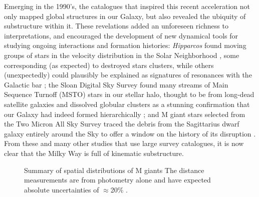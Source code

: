 \documentclass[galaxies,article,submit,moreauthors,pdftex,10pt,a4paper]{mdpi}
\newcommand{\survey}[1]{\textsl{#1}}
\begin{document}
Emerging in the 1990's, the catalogues that inspired this recent acceleration not only mapped global structures in our Galaxy, but also revealed the ubiquity of substructure within it.
These revelations added an unforeseen richness to interpretations, and encouraged the development of new dynamical tools for studying ongoing interactions and formation histories:
\survey{Hipparcos} \citep{esa97} found moving groups of stars in the velocity distribution in the Solar Neighborhood \citep{dehnen98}, some corresponding (as expected) to destroyed stars clusters, while others (unexpectedly) could plausibly be explained as signatures of resonances with the Galactic bar \citep{dehnen00};
the Sloan Digital Sky Survey \citep[hereafter, SDSS ---][]{york00,stoughton02,abazajian03} found many streams of Main Sequence Turnoff (MSTO) stars in our stellar halo, thought to be from long-dead satellite galaxies and dissolved globular clusters \citep{newberg02,belokurov06} as a stunning confirmation that our Galaxy had indeed formed hierarchically \citep[e.g.][]{bullock01,bullock05};
and M giant stars selected from the Two Micron All Sky Survey \citep[hereafter, 2MASS ---][]{nikolaev00} traced the debris from the Sagittarius dwarf galaxy entirely around the Sky \citep{majewski03} to offer a window on the history of its disruption \citep{law10}.
From these and many other studies that use large survey catalogues, it is now clear that the Milky Way is full of kinematic substructure.

\begin{figure}[t]
\label{fig:ting}
\centering
\caption{\label{fig:ting}
Summary of spatial distributions of M giants
The distance measurements are from photometry alone and have expected absolute uncertainties of $\approx$20\% \citep{sheffield14}.
}
\end{figure}
\end{document}
